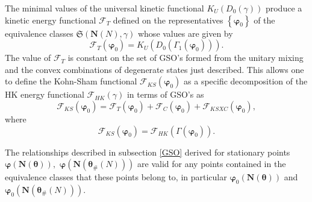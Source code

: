 \documentclass[aps,preprint]{revtex4}%
\begin{document}
The minimal values of the universal kinetic functional $K_{U}\left(
D_{0}\left(  \gamma\right)  \right)  $ produce a kinetic energy functional
$\mathcal{F}_{T}$ defined on the representatives $\left\{  \mathbf{\varphi
}_{0}\right\}  $ of the equivalence classes $\mathfrak{S}\left(
\mathbf{N}\left(  N\right)  \mathbf{,}\gamma\right)  $ whose values are given
by
\begin{equation}
\mathcal{F}_{T}\left(  \mathbf{\varphi}_{0}\right)  =K_{U}\left(  D_{0}\left(
\Gamma_{1}\left(  \mathbf{\varphi}_{0}\right)  \right)  \right)  .
\label{KEFunc}%
\end{equation}
The value of $\mathcal{F}_{T}$ is constant on the set of GSO's formed from the
unitary mixing and the convex combinations of degenerate states just
described. This allows one to define the Kohn-Sham functional $\mathcal{F}%
_{KS}\left(  \mathbf{\varphi}_{0}\right)  $ as a specific decomposition of the
HK energy functional $\mathcal{F}_{HK}\left(  \gamma\right)  $ in terms of
GSO's as
\begin{equation}
\mathcal{F}_{KS}\left(  \mathbf{\varphi}_{0}\right)  =\mathcal{F}_{T}\left(
\mathbf{\varphi}_{0}\right)  +\mathcal{F}_{C}\left(  \mathbf{\varphi}%
_{0}\right)  +\mathcal{F}_{KSXC}\left(  \mathbf{\varphi}_{0}\right)  ,
\end{equation}
where
\begin{equation}
\mathcal{F}_{KS}\left(  \mathbf{\varphi}_{0}\right)  =\mathcal{F}_{HK}\left(
\Gamma\left(  \mathbf{\varphi}_{0}\right)  \right)  .
\end{equation}


The relationships described in subsection \ref{GSO} derived for stationary
points $\mathbf{\varphi}\left(  \mathbf{N}\left(  \mathbf{\theta}\right)
\right)  ,$ $\mathbf{\varphi}\left(  \mathbf{N}\left(  \mathbf{\theta}%
_{\#}\left(  N\right)  \right)  \right)  $ are valid for any points contained
in the equivalence classes that these points belong to, in particular
$\mathbf{\varphi}_{0}\left(  \mathbf{N}\left(  \mathbf{\theta}\right)
\right)  $ and $\mathbf{\varphi}_{0}\left(  \mathbf{N}\left(  \mathbf{\theta
}_{\#}\left(  N\right)  \right)  \right)  .$
\end{document}
